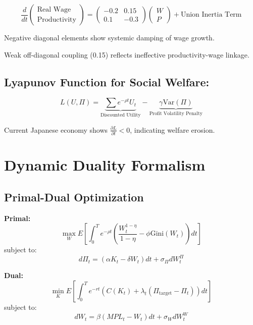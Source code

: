 \documentclass[10pt]{article}
\theoremstyle{definition}
\begin{document}
\begin{equation}
\frac{d}{dt} \begin{pmatrix} \text{Real Wage} \\ \text{Productivity} \end{pmatrix} = \begin{pmatrix} -0.2 & 0.15 \\ 0.1 & -0.3 \end{pmatrix} \begin{pmatrix} W \\ P \end{pmatrix} + \text{Union Inertia Term}
\end{equation}

Negative diagonal elements show systemic damping of wage growth.

Weak off-diagonal coupling (0.15) reflects ineffective productivity-wage linkage.

\subsection{Lyapunov Function for Social Welfare:}

\begin{equation}
L(U, \Pi) = \underbrace{\sum e^{-\rho t} U_t}_{\text{Discounted Utility}} - \underbrace{\gamma \text{Var}(\Pi)}_{\text{Profit Volatility Penalty}}
\end{equation}

Current Japanese economy shows $\frac{\partial L}{\partial t} < 0$, indicating welfare erosion.

\section{Dynamic Duality Formalism}

\subsection{Primal-Dual Optimization}

\textbf{Primal:}
\begin{equation}
\max_{W} E\left[ \int_0^T e^{-\rho t} \left( \frac{W_t^{1-\eta}}{1-\eta} - \phi \text{Gini}(W_t) \right) dt \right]
\end{equation}
subject to:
\begin{equation}
d\Pi_t = (\alpha K_t - \delta W_t) dt + \sigma_\Pi dW_t^\Pi
\end{equation}

\textbf{Dual:}
\begin{equation}
\min_{K} E\left[ \int_0^T e^{-rt} \left( C(K_t) + \lambda_t (\Pi_{\text{target}} - \Pi_t) \right) dt \right]
\end{equation}
subject to:
\begin{equation}
dW_t = \beta (MPL_t - W_t) dt + \sigma_W dW_t^W
\end{equation}
\end{document}
